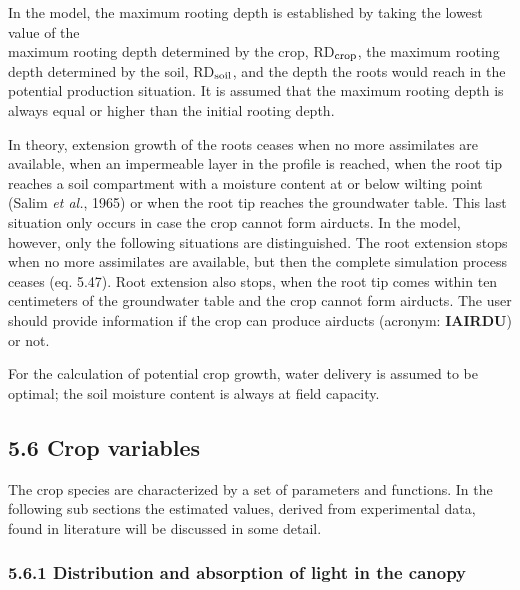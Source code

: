 \documentclass[11pt]{article}
\begin{document}
\bigskip
In the model, the maximum rooting depth is established by taking the lowest value of the\\
maximum rooting depth determined by the crop, RD$_{{\rm crop}}$, the maximum rooting depth
determined by the soil, RD$_{{\rm soil}}$, and the depth the roots would reach in the potential
production situation. It is assumed that the maximum rooting depth is always equal or
higher than the initial rooting depth.

\bigskip
In theory, extension growth of the roots ceases when no more assimilates are available,
when an impermeable layer in the profile is reached, when the root tip reaches a soil
compartment with a moisture content at or below wilting point (Salim {\it et al.\/}, 1965) or
when the root tip reaches the groundwa\-ter table. This last situation only occurs in case
the crop cannot form airducts. In the model, however, only the following situations are
distinguished. The root extension stops when no more assimilates are available, but then
the complete simulation process ceases (eq. 5.47). Root extension also stops, when the
root tip comes within ten centime\-ters of the groundwater table and the crop cannot form
airducts. The user should provide information if the crop can produce airducts (acronym:
{\bf IAIRDU}) or not.

\bigskip
For the calculation of potential crop growth, water delivery is assumed to be optimal; the
soil moisture content is always at field capacity.

\bigskip

\newpage

\subsection{  5.6 Crop variables  }

The crop species are characterized by a set of parameters and functions. In the following
sub sections the estimated values, derived from experimental data, found in litera\-ture will
be discussed in some detail.

\bigskip
\bigskip

\subsubsection{  5.6.1 Distribution and absorption of light in the canopy  } 
\end{document}
